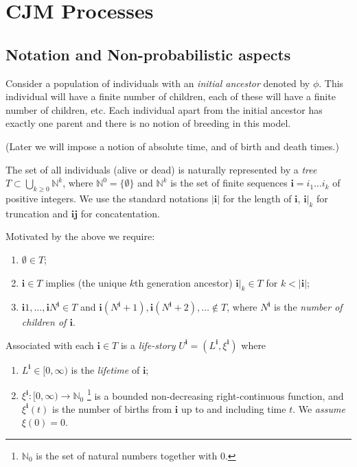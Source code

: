 \documentclass[a4paper]{amsart}
\theoremstyle{plain}
\theoremstyle{definition}
\theoremstyle{remark}
\begin{document}
\section{CJM Processes}

\subsection{Notation and Non-probabilistic aspects}

Consider a population of individuals with an \emph{initial ancestor} denoted by $ \phi $.  This individual will have a finite number of children, each of these  will have a finite number of children, etc.  Each individual apart from the initial ancestor  has exactly one parent and there is no notion of breeding in this model.

(Later we will impose  a notion  of absolute time,  and of birth and death times.) 

\medskip The set of all individuals (alive or dead) is naturally represented by a \emph{tree} $ T \subset \bigcup_{k\geq 0 } \mathbb{N}  ^k $, where $ \mathbb{N} ^0 = \{ \emptyset \} $ and $ \mathbb{N} ^k $ is the set of finite sequences $ \boldsymbol{i} = i_1\dots i_k $ of positive integers.
We  use the standard notations $ | \boldsymbol{i} |$ for the length of $ \boldsymbol{i} $, $ \boldsymbol{i} |_k $ for truncation and $ \boldsymbol{i} \boldsymbol{j} $ for concatentation.

Motivated by the above we require:
\begin{enumerate}
\item $ \emptyset \in T $;
\item $ \boldsymbol{i} \in T $ implies (the unique $ k $th generation ancestor)  $ \boldsymbol{i} |_k \in T $ for $ k < | \boldsymbol{i}| $;
\item $ \boldsymbol{i} 1,\dots ,  \boldsymbol{i} N^{ \boldsymbol{i} }  \in T $ and $\boldsymbol{i} (N^{ \boldsymbol{i} }+1), \boldsymbol{i} (N^{ \boldsymbol{i} }+2), \dots \notin T $, where $  N^{ \boldsymbol{i} } $ is the \emph{number of children of $ \boldsymbol{i} $}.
\end{enumerate} 

\medskip Associated with each $ \boldsymbol{i} \in T $ is a \emph{life-story} $ U^{ \boldsymbol{i} } = (L^{ \boldsymbol{i} }, \xi^{ \boldsymbol{i} } ) $ where 
\begin{enumerate}
\item $ L^{ \boldsymbol{i} } \in [0,\infty) $  is the \emph{lifetime} of $ \boldsymbol{i} $;
\item $ \xi ^ { \boldsymbol{i} } : [0,\infty) \to \mathbb{N} _ 0 $%
\footnote{$ \mathbb{N} _ 0 $ is the set of natural numbers together with $ 0 $.} 
is a bounded non-decreasing right-continuous function, and $ \xi ^{ \boldsymbol{i} } ( t) $ is the number of births  from  $ \boldsymbol{i} $ up to and including time $ t $. 
We \emph{assume} $ \xi (0) = 0 $.
\end{enumerate} 
\end{document}
